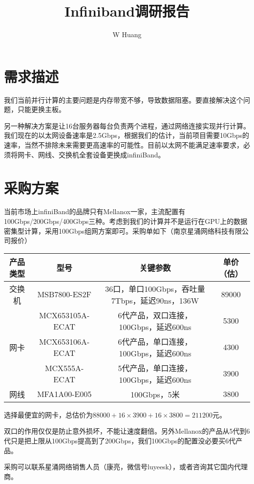 \documentclass[lang=cn,11pt,a4paper]{elegantpaper}
\title{Infiniband调研报告}
\author{W Huang}
\date{\zhtoday}
\begin{document}
\maketitle

\section{需求描述}

我们当前并行计算的主要问题是内存带宽不够，导致数据阻塞。要直接解决这个问题，只能更换主板。

另一种解决方案是让16台服务器每台负责两个进程，通过网络连接实现并行计算。我们现在的以太网设备速率是2.5Gbps，根据我们的估计，当前项目需要10Gbps的速率，当然不排除未来需要更高速率的可能性。目前以太网不能满足速率要求，必须将网卡、网线、交换机全套设备更换成infiniBand。

\section{采购方案}

当前市场上infiniBand的品牌只有Mellanox一家，主流配置有100Gbps/200Gbps/400Gbps三种。考虑到我们的计算并不是运行在GPU上的数据密集型计算，采用100Gbps组网方案即可。采购单如下（南京星涌网络科技有限公司报价）

\begin{table}[H]
    \begin{tabular}{|c|c|c|c|}
    \hline
    \textbf{产品类型}       & \textbf{型号}     & \textbf{关键参数}                      & \textbf{单价（估）} \\ \hline
    交换机                 & MSB7800-ES2F    & 36口，单口100Gbps，吞吐量7Tbps，延迟90ns，136W & 89000          \\ \hline
    \multirow{3}{*}{网卡} & MCX653105A-ECAT & 6代产品，双口连接，100Gbps，延迟600ns          & 5300           \\ \cline{2-4} 
                        & MCX653106A-ECAT & 6代产品，单口连接，100Gbps，延迟600ns          & 4300           \\ \cline{2-4} 
                        & MCX555A-ECAT    & 5代产品，单口连接，100Gbps，延迟600ns          & 3900           \\ \hline
    网线                  & MFA1A00-E005    & 100Gbps，5米                         & 3800           \\ \hline
    \end{tabular}
\end{table}

选择最便宜的网卡，总估价为$88000+16\times 3900+16\times3800=211200$元。

双口的作用仅仅是防止意外损坏，不能让速度翻倍。另外Mellanox的产品从5代到6代只是把上限从100Gbps提高到了200Gbps，我们100Gbps的配置没必要买6代产品。

采购可以联系星涌网络销售人员（康亮，微信号luyeesk），或者咨询其它国内代理商。

\appendix
\addappheadtotoc
\end{document}
